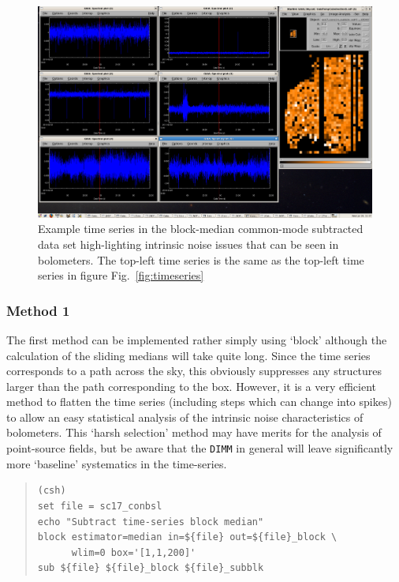 \documentclass[twoside,11pt]{article}
\newcommand{\xlabel}[1]{}
\renewcommand{\_}{\texttt{\symbol{95}}}
\newenvironment{myquote}{\begin{quote}\begin{small}}{\end{small}\end{quote}}
\begin{document}
\begin{figure}
\begin{center}
\includegraphics[width=1.0\linewidth]{sc19_timeseries2}
\caption{Example time series in the block-median common-mode
subtracted data set high-lighting intrinsic noise issues that can be
seen in bolometers. The top-left time series is the same as the
top-left time series in figure Fig.~\ref{fig:timeseries}}
\label{fig:timeseries2}
\end{center}
\end{figure}

\subsubsection{\xlabel{method1}Method 1}
\label{sec:method1}

The first method can be implemented rather simply using `block'
although the calculation of the sliding medians will take quite
long. Since the time series corresponds to a path across the sky, this
obviously suppresses any structures larger than the path corresponding
to the box. However, it is a very efficient method to flatten the time
series (including steps which can change into spikes) to allow an easy
statistical analysis of the intrinsic noise characteristics of
bolometers.  This `harsh selection' method may have merits for the
analysis of point-source fields, but be aware that the \texttt{DIMM}
in general will leave significantly more `baseline' systematics in the
time-series.

\begin{myquote}
\begin{verbatim}
(csh)
set file = sc17_conbsl
echo "Subtract time-series block median"
block estimator=median in=${file} out=${file}_block \
      wlim=0 box='[1,1,200]'
sub ${file} ${file}_block ${file}_subblk
\end{verbatim}
\end{myquote}
\end{document}
